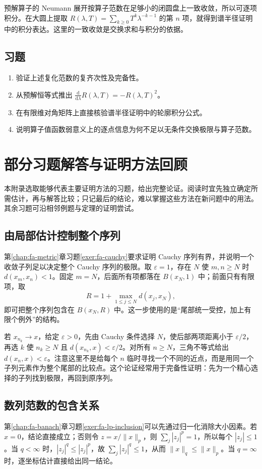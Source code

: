 \documentclass[UTF8,12pt,a4paper,fontset=fandol]{ctexbook}
\begin{document}
预解算子的 Neumann 展开按算子范数在足够小的闭圆盘上一致收敛，所以可逐项积分。在大圆上提取 $R(\lambda,T)=\sum_{k\geq0}T^k\lambda^{-k-1}$ 的第 $n$ 项，就得到谱半径证明中的积分表达。这里的一致收敛是交换求和与积分的依据。

\section{习题}
\begin{enumerate}
 \item 验证上述复化范数的复齐次性及完备性。
 \item 从预解恒等式推出 $\frac{\mathrm d}{\mathrm d\lambda}R(\lambda,T)=-R(\lambda,T)^2$。
 \item 在有限维对角矩阵上直接核验谱半径证明中的轮廓积分公式。
 \item 说明算子值函数弱意义上的逐点信息为何不足以无条件交换极限与算子范数。
\end{enumerate}

\chapter{部分习题解答与证明方法回顾}
\label{app:fa-solutions}

本附录选取能够代表主要证明方法的习题，给出完整论证。阅读时宜先独立确定所需估计，再与解答比较；只记最后的结论，难以掌握这些方法在新问题中的用法。其余习题可沿相邻例题与定理的证明尝试。

\section{由局部估计控制整个序列}
第\ref{chap:fa-metric}章习题\ref{exer:fa-cauchy}要求证明 Cauchy 序列有界，并说明一个收敛子列足以决定整个 Cauchy 序列的极限。取 $\varepsilon=1$，存在 $N$ 使 $m,n\geq N$ 时 $d(x_m,x_n)<1$。固定 $m=N$，后面所有项都落在 $B(x_N,1)$ 中；前面只有有限项，取
\[
 R=1+\max_{1\leq j\leq N}d(x_j,x_N),
\]
即可把整个序列包含在 $B(x_N,R)$ 中。这一步使用的是“尾部统一受控，加上有限个例外”的结构。

若 $x_{n_k}\to x$，给定 $\varepsilon>0$，先由 Cauchy 条件选择 $N$，使后部两项距离小于 $\varepsilon/2$，再选 $k$ 使 $n_k\geq N$ 且 $d(x_{n_k},x)<\varepsilon/2$。对所有 $n\geq N$，三角不等式给出 $d(x_n,x)<\varepsilon$。注意这里不是给每个 $n$ 临时寻找一个不同的近点，而是用同一个子列元素作为整个尾部的比较点。这个论证经常用于完备性证明：先为一个精心选择的子列找到极限，再回到原序列。

\section{数列范数的包含关系}
第\ref{chap:fa-banach}章习题\ref{exer:fa-lp-inclusion}可以先通过归一化消除大小因素。若 $x=0$，结论直接成立；否则令 $z=x/\|x\|_p$，则 $\sum_j|z_j|^p=1$，所以每个 $|z_j|\leq1$。当 $q<\infty$ 时，$|z_j|^q\leq|z_j|^p$，故 $\sum_j|z_j|^q\leq1$，从而 $\|x\|_q\leq\|x\|_p$。当 $q=\infty$ 时，逐坐标估计直接给出同一结论。
\end{document}
